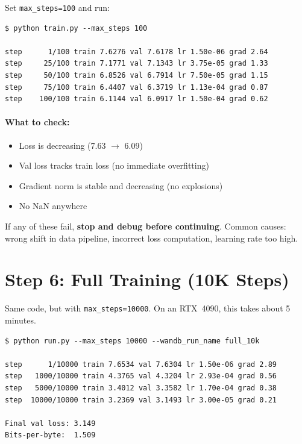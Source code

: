 Set \texttt{max\_steps=100} and run:

\begin{lstlisting}[language={}, caption={Smoke run output}]
$ python train.py --max_steps 100

step      1/100 train 7.6276 val 7.6178 lr 1.50e-06 grad 2.64
step     25/100 train 7.1771 val 7.1343 lr 3.75e-05 grad 1.33
step     50/100 train 6.8526 val 6.7914 lr 7.50e-05 grad 1.15
step     75/100 train 6.4407 val 6.3719 lr 1.13e-04 grad 0.87
step    100/100 train 6.1144 val 6.0917 lr 1.50e-04 grad 0.62
\end{lstlisting}

\paragraph{What to check:}
\begin{itemize}[nosep]
  \item Loss is decreasing (7.63 $\to$ 6.09)
  \item Val loss tracks train loss (no immediate overfitting)
  \item Gradient norm is stable and decreasing (no explosions)
  \item No NaN anywhere
\end{itemize}

If any of these fail, \textbf{stop and debug before continuing}.
Common causes: wrong shift in data pipeline, incorrect loss computation, learning rate too high.


\section{Step 6: Full Training (10K Steps)}
\label{sec:guide-full}

Same code, but with \texttt{max\_steps=10000}.
On an RTX~4090, this takes about 5 minutes.

\begin{lstlisting}[language={}, caption={Full training run}]
$ python run.py --max_steps 10000 --wandb_run_name full_10k

step      1/10000 train 7.6534 val 7.6304 lr 1.50e-06 grad 2.89
step   1000/10000 train 4.3765 val 4.3204 lr 2.93e-04 grad 0.56
step   5000/10000 train 3.4012 val 3.3582 lr 1.70e-04 grad 0.38
step  10000/10000 train 3.2369 val 3.1493 lr 3.00e-05 grad 0.21

Final val loss: 3.149
Bits-per-byte:  1.509
\end{lstlisting}

